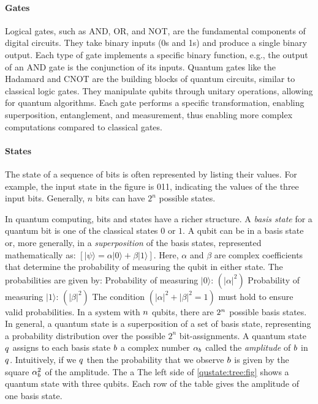 \paragraph{Gates}
Logical gates, such as AND, OR, and NOT, are the fundamental components of digital circuits. 
%
They take binary inputs (0s and 1s) and produce a single binary output.
%
Each type of gate implements a specific binary function, e.g., the output of an AND gate is the conjunction of its inputs.
%
Quantum gates like the Hadamard and CNOT are the building blocks of quantum circuits, similar to classical logic gates. They manipulate qubits through unitary operations, allowing for quantum algorithms. Each gate performs a specific transformation, enabling superposition, entanglement, and measurement, thus enabling more complex computations compared to classical gates.

\paragraph{States}
The state of a sequence of bits is often represented by listing their values. For example, the input state in the figure is 011, indicating the values of the three input bits. Generally, $n$ bits can have $2^n$ possible states. 
%

In quantum computing, bits and states have a richer structure.
%
A {\it basis state} for a quantum bit is one of the classical states $0$ or $1$.
%
A qubit can be in a basis state or, more generally, in a {\it superposition} of the basis states, represented mathematically as: $[|\psi⟩ = \alpha |0⟩ + \beta |1⟩ ]$.
Here, $\alpha$ and $\beta$ are complex coefficients that determine the probability of measuring the qubit in either state.
The probabilities are given by:
Probability of measuring $|0⟩$: $( |\alpha|^2 )$
Probability of measuring $|1⟩$: $( |\beta|^2 )$
The condition $( |\alpha|^2 + |\beta|^2 = 1 )$ must hold to ensure valid probabilities.
%
In a system with $n$ qubits, there are $2^n$ possible basis states.
%
In general, a quantum state is a superposition of a set of basis state, representing a probability distribution over the possible $2^n$ bit-assignments.
%
A quantum state $q$ assigns to each basis state $b$ a complex number $\alpha_b$ called the {\it amplitude} of $b$ in $q$.
%
Intuitively, if we  $q$ then the probability that we observe $b$ is given by the square $\alpha_b^2$ of the amplitude.
%
The a
The left side of \cref{qustate:tree:fig} shows a quantum state with three qubits.
%
Each row of the table gives the amplitude of one basis state.
%


